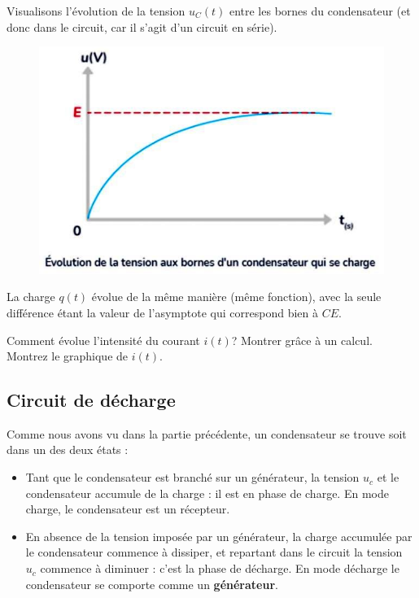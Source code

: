 \documentclass[11pt,a4paper]{article}
\begin{document}
Visualisons l'évolution de la tension $u_C(t)$ entre les bornes du condensateur (et donc dans le circuit, car il s'agit d'un circuit en série). 

\begin{figure}[H]
    \centering
    \includegraphics[width=0.7\linewidth]{imgs/p7/courbeCharge.jpg}
\end{figure}

La charge $q(t)$ évolue de la même manière (même fonction), avec la seule différence étant la valeur de l'asymptote qui correspond bien à $CE$. 

\begin{exo}  %
Comment évolue l'intensité du courant $i(t)$? Montrer grâce à un calcul. Montrez le graphique de $i(t)$. 
\vspace{5cm}
\end{exo}




\subsection{Circuit de décharge}

Comme nous avons vu dans la partie précédente, un condensateur se trouve soit dans un des deux états : 
\begin{itemize}
    \item Tant que le condensateur est branché sur un générateur, la tension $u_c $ et le condensateur accumule de la charge : il est en phase de charge. En mode charge, le condensateur est un récepteur. 
    \item En absence de la tension imposée par un générateur, la charge accumulée par le condensateur commence à dissiper, et repartant dans le circuit la tension $u_c$ commence à diminuer : c'est la phase de décharge. En mode décharge le condensateur se comporte comme un \textbf{générateur}. 
\end{itemize}
\end{document}
